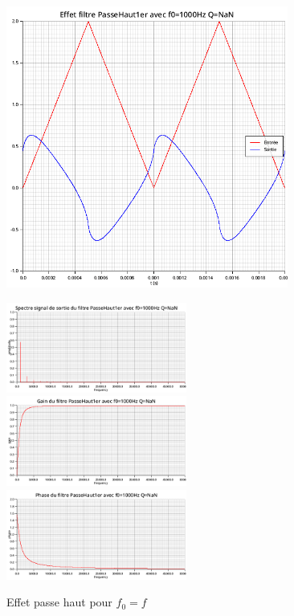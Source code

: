 \documentclass{article}
\begin{document}
\begin{figure}[H]
  \begin{minipage}{0.6\textwidth}
      \centering
      \includegraphics[width=25em]{images/triangulaire/haut/signals.png}
  \end{minipage}
  \begin{minipage}{0.3\textwidth}
      \centering
      \includegraphics[width=16em]{images/triangulaire/haut/fft_out.png}
      \vfill
      \includegraphics[width=16em]{images/triangulaire/haut/gain.png}
      \vfill
      \includegraphics[width=16em]{images/triangulaire/haut/phase.png}
  \end{minipage}
  \caption{Effet passe haut pour $f_0=f$}
\end{figure}
\end{document}
